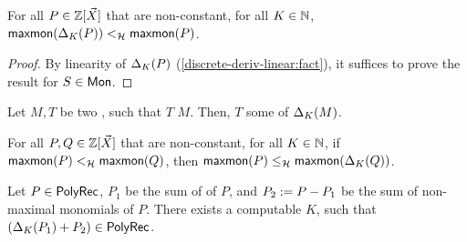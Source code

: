 \begin{lemma}
    \label{derivation-simplifies:lemma}
    For all $P \in \mathbb{Z}[\vec{X}]$ that are non-constant,
    for all $K \in \mathbb{N}$,
    $\mathop{\mathsf{maxmon}}(\Delta_{K}(P)) <_{\mathcal{H}}
    \mathop{\mathsf{maxmon}}(P)$.
\end{lemma}
\begin{proof}
    By linearity of $\Delta_{K}(P)$ (\cref{discrete-deriv-linear:fact}), 
    it suffices to prove the result
    for  $S \in \Monomials$.
\end{proof}

\begin{fact}
    Let $M,T$ be two , such that
    $T$  $M$.
    Then,
    $T$  some 
    of $\Delta_{K}(M)$.
\end{fact}

\begin{lemma}
    \label{derivation-covers:lemma}
    For all $P,Q \in \mathbb{Z}[\vec{X}]$ that are non-constant,
    for all $K \in \mathbb{N}$,
    if $\mathop{\mathsf{maxmon}}(P) <_{\mathcal{H}} \mathop{\mathsf{maxmon}}(Q)$,
    then
    $\mathop{\mathsf{maxmon}}(P) \leq_{\mathcal{H}} \mathop{\mathsf{maxmon}}(\Delta_{K}(Q))$.
\end{lemma}


\begin{lemma}
    \label{derivation-stabilises-correct:lem}
    Let $P \in \mathsf{PolyRec}$,
    $P_1$ be the sum of  of $P$,
    and $P_2 \mathrel{:=} P - P_1$ be the sum of
    non-maximal monomials of $P$.
    There exists a computable $K$,
    such that
    $(\Delta_{K}(P_1) + P_2) \in \mathsf{PolyRec}$.
\end{lemma}


